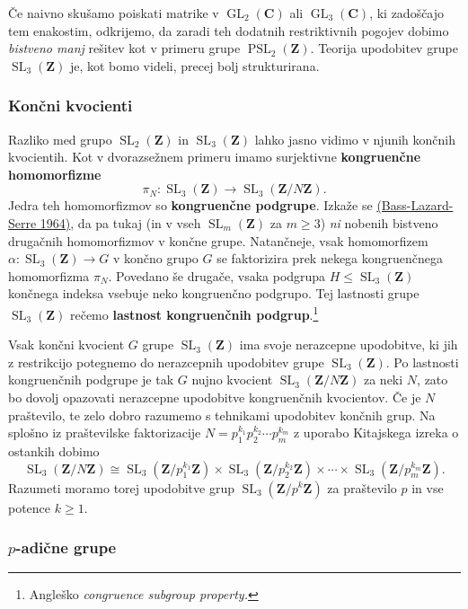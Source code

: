 \documentclass[11pt]{book}
\def\ZZ{\mathbf{Z}}
\def\CC{\mathbf{C}}
\DeclareMathOperator\GL{GL}
\DeclareMathOperator\SL{SL}
\DeclareMathOperator\PSL{PSL}
\def\definicija{\color{rdeca}\bf}
\theoremstyle{definition}
\theoremstyle{zgled}
\theoremstyle{zgledbrezstevilke}
\theoremstyle{odprtproblem}
\theoremstyle{domacanaloga}
\theoremstyle{izrek}
\begin{document}
Če naivno skušamo poiskati matrike v $\GL_2(\CC)$ ali $\GL_3(\CC)$, ki zadoščajo tem enakostim, odkrijemo, da zaradi teh dodatnih restriktivnih pogojev dobimo \emph{bistveno manj} rešitev kot v primeru grupe $\PSL_2(\ZZ)$. Teorija upodobitev grupe $\SL_3(\ZZ)$ je, kot bomo videli, precej bolj strukturirana.

\subsubsection{Končni kvocienti}

Razliko med grupo $\SL_2(\ZZ)$ in $\SL_3(\ZZ)$ lahko jasno vidimo v njunih končnih kvocientih. Kot v dvorazsežnem primeru imamo surjektivne {\definicija kongruenčne homomorfizme}
\[
    \textstyle \pi_N \colon \SL_3(\ZZ) \to \SL_3(\ZZ/N\ZZ).
\]
Jedra teh homomorfizmov so {\definicija kongruenčne podgrupe}. Izkaže se \href{https://projecteuclid.org/journals/bulletin-of-the-american-mathematical-society-new-series/volume-70/issue-3/Sous-groupes-dindice-fini-dans-SLleft-nZ-right/bams/1183526018.full}{(Bass-Lazard-Serre 1964)}, da pa tukaj (in v vseh $\SL_m(\ZZ)$ za $m \geq 3$) \emph{ni} nobenih bistveno drugačnih homomorfizmov v končne grupe. Natančneje, vsak homomorfizem $\alpha \colon \SL_3(\ZZ) \to G$ v končno grupo $G$ se faktorizira prek nekega kongruenčnega homomorfizma $\pi_N$. Povedano še drugače, vsaka podgrupa $H \leq \SL_3(\ZZ)$ končnega indeksa vsebuje neko kongruenčno podgrupo. Tej lastnosti grupe $\SL_3(\ZZ)$ rečemo {\definicija lastnost kongruenčnih podgrup}.\footnote{Angleško \emph{congruence subgroup property.}}

Vsak končni kvocient $G$ grupe $\SL_3(\ZZ)$ ima svoje nerazcepne upodobitve, ki jih z restrikcijo potegnemo do nerazcepnih upodobitev grupe $\SL_3(\ZZ)$. Po lastnosti kongruenčnih podgrupe je tak $G$ nujno kvocient $\SL_3(\ZZ/N\ZZ)$ za neki $N$, zato bo dovolj opazovati nerazcepne upodobitve kongruenčnih kvocientov. Če je $N$ praštevilo, te zelo dobro razumemo s tehnikami upodobitev končnih grup. Na splošno iz praštevilske faktorizacije $N = p_1^{k_1} p_2^{k_2} \cdots p_m^{k_m}$ z uporabo Kitajskega izreka o ostankih dobimo
\[
    \textstyle \SL_3(\ZZ/N\ZZ) \cong \SL_3(\ZZ/p_1^{k_1}\ZZ) \times \SL_3(\ZZ/p_2^{k_2}\ZZ) \times \cdots \times \SL_3(\ZZ/p_m^{k_m}\ZZ).
\]
Razumeti moramo torej upodobitve grup $\SL_3(\ZZ/p^k\ZZ)$ za praštevilo $p$ in vse potence $k \geq 1$. 

\subsubsection{$p$-adične grupe}
\end{document}
